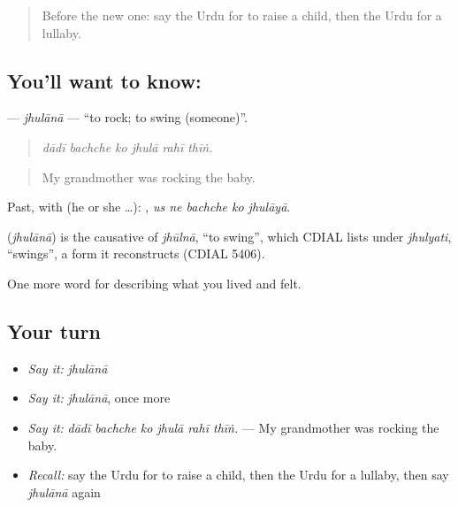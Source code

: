 \label{lesson:UR-C484-jhulana}



\begin{quote}
Before the new one: say the Urdu for to raise a child, then the Urdu for a lullaby.
\end{quote}

\subsection*{You'll want to know: }
\textbf{} — \emph{jhulānā} — \textquotedblleft{}to rock; to swing (someone)\textquotedblright{}.

\begin{quote}
     
\end{quote}

\begin{quote}
\emph{dādī bachche ko jhulā rahī thīṅ.}
\end{quote}

\begin{quote}
My grandmother was rocking the baby.
\end{quote}

Past, with  (he or she …):     , \emph{us ne bachche ko jhulāyā}.

\begin{cousinweb}
\textbf{} (\emph{jhulānā}) is the causative of \emph{jhūlnā}, \textquotedblleft{}to swing\textquotedblright{}, which CDIAL lists under \emph{jhulyati}, \textquotedblleft{}swings\textquotedblright{}, a form it reconstructs (CDIAL 5406).
\end{cousinweb}

\begin{grammarlens}[title={What you've built}]
One more word for describing what you lived and felt.
\end{grammarlens}

\subsection*{Your turn}
\begin{itemize}
\raggedright
  \item \emph{Say it:} \emph{jhulānā}
  \item \emph{Say it:} \emph{jhulānā}, once more
  \item \emph{Say it:} \emph{dādī bachche ko jhulā rahī thīṅ.} — My grandmother was rocking the baby.
  \item \emph{Recall:} say the Urdu for to raise a child, then the Urdu for a lullaby, then say \emph{jhulānā} again
\end{itemize}

